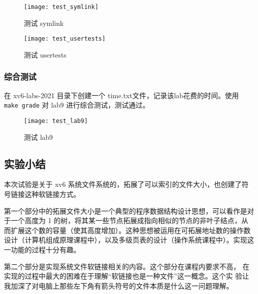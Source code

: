 \begin{figure}[!htb]
	\centering
	\texttt{[image: test\_symlink]}
	\caption{测试 symlink}
	\label{fig:test_symlink}
\end{figure}

\begin{figure}[!htb]
	\centering
	\texttt{[image: test\_usertests]}
	\caption{测试 usertests}
	\label{fig:test_usertests}
\end{figure}

\subsubsection{综合测试}

在 xv6-labs-2021 目录下创建一个 time.txt文件，记录该lab花费的时间。使用 \texttt{make grade} 对 lab9 进行综合测试，测试通过。

\begin{figure}[!htb]
	\centering
	\texttt{[image: test\_lab9]}
	\caption{测试 lab9}
	\label{fig:test_lab9}
\end{figure}

\subsection{实验小结}

本次试验是关于 xv6 系统文件系统的，拓展了可以索引的文件大小，也创建了符号链接这种软链接方式。

第一个部分中的拓展文件大小是一个典型的程序数据结构设计思想，可以看作是对于一个高度为 1 的树，将其某一些节点拓展成指向相似的节点的非叶子结点，从而扩展这个数的容量（使其高度增加）。这种思想被运用在可拓展地址数的操作数设计（计算机组成原理课程中），以及多级页表的设计（操作系统课程中）。实现这一功能的过程十分有趣。

第二个部分是实现系统文件软链接相关的内容。这个部分在课程内要求不高， 在实现的过程中最大的困难在于理解“软链接也是一种文件”这一概念。这个实 验让我加深了对电脑上那些左下角有箭头符号的文件本质是什么这一问题理解。
